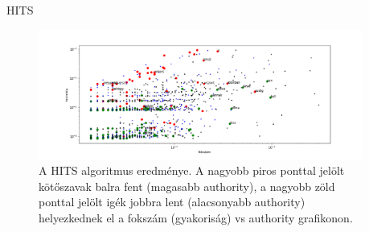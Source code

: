 \documentclass{beamer}
\newlength{\sepwid}
\newlength{\twocolwid}
\begin{document}
\begin{frame}[t]
\begin{columns}[t]
\begin{column}{\twocolwid}
        \begin{block}{HITS}
          \begin{figure}[h]
            \begin{center}
              \includegraphics[width=\columnwidth]{conj-verb-auth.png}
                  \caption{A HITS algoritmus eredménye.
                  A nagyobb piros ponttal jelölt kötőszavak balra fent
                  (magasabb authority),
                  a nagyobb zöld ponttal jelölt igék jobbra lent
                  (alacsonyabb authority)
                  helyezkednek el
                  a fokszám (gyakoriság) vs authority grafikonon.}
            \end{center}
                \label{fig:hits-auth}
          \end{figure}
        \end{block}
      \end{column}

    \begin{column}{\sepwid} \end{column}			%


\end{columns}
\end{frame}
\end{document}
